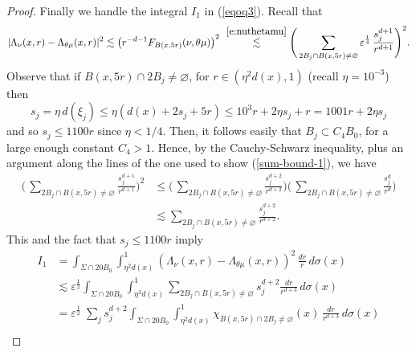 \documentclass[11pt]{amsart}
\newcommand{\rf}[1]{{(\ref{#1})}}
\newcommand{\ve}{{\varepsilon}}
\theoremstyle{definition}
\theoremstyle{remark}
\numberwithin{equation}{section}
\newcommand{\ps}[1]{\left( #1 \right)}
\def\lec{\lesssim}
\def\lec{\lesssim}
\newcommand{\jonas}[1]{}%
\begin{document}
\begin{proof}
Finally we handle the integral $I_1$ in \rf{eqoq3}.
 Recall that 
\begin{align*}
|\Lambda_{\nu}(x,r)-\Lambda_{\theta\mu}(x,r)|^{2}
&\lec \ps{r^{-d-1} F_{B(x,5r)}(\nu,\theta\mu)}^{2}
& \!\!\stackrel{\eqref{e:nuthetamu}}{ \lec}  \Biggl(\,\sum_{2B_{j}\cap B(x,5r)\neq\varnothing} \ve^{\frac14}\, \frac{s_{j}^{d+1}}{r^{d+1}}\Biggr)^{2}.
\end{align*}
Observe that if $B(x,5r)\cap 2B_{j}\neq\varnothing$, for $r\in (\eta^2d(x),1)$ (recall $\eta=10^{-3}$) then
\[
s_{j}=\eta\, d(\xi_{j}) \leq \eta(d(x)+2s_{j} + 5r) \leq 10^3r + 2\eta s_{j}+ r=1001r+2\eta s_{j}\]
and so $s_{j}\leq 1100r$ since $\eta<1/4$. Then, it follows easily that $B_j\subset C_4B_0$, for a large enough
constant $C_4>1$.
Hence, by the Cauchy-Schwarz inequality, plus an argument along the lines of the one used to show \rf{sum-bound-1}, we have
\begin{align*}
\biggl(\,\sum_{2B_{j}\cap B(x,5r)\neq\varnothing}  \frac{s_{j}^{d+1}}{r^{d+1}}\biggr)^{2}
& \leq 
\Biggl(\,\sum_{2B_{j}\cap B(x,5r)\neq\varnothing} \frac{s_{j}^{d+2}}{r^{d+2}}\Biggr)
\Biggl(\,\sum_{2B_{j}\cap B(x,5r)\neq\varnothing} \frac{s_{j}^{d}}{r^{d}}\Biggr)\\
& \lesssim \sum_{2B_{j}\cap B(x,5r)\neq\varnothing} \frac{s_{j}^{d+2}}{r^{d+2}}.
\end{align*}
This and the fact that $s_{j}\leq 1100r$ imply
\begin{align*}
I_1 &= \int_{\Sigma \cap 20 B_0} \int_{\eta^2 d(x)}^{1} \!(\Lambda_{\nu}(x,r)-  \Lambda_{\theta \mu}(x,r))^{2}\,\frac{dr}{r}\,d\sigma(x)\\
& \lec \ve^{\frac12} \int_{\Sigma\cap 20 B_{0}}\int_{\eta^2 d(x)}^{1} \sum_{2B_{j}\cap B(x,5r)\neq\varnothing}  s_{j}^{d+2} \frac{dr}{r^{d+3}}\, d\sigma(x) \\
& = \ve^{\frac12} \;\sum_{j} s_{j}^{d+2}  \int_{\Sigma\cap 20 B_{0}}\int_{\eta^2 d(x)}^{1}\chi_{B(x,5r)\cap 2B_{j}\neq\varnothing}(x)\, \frac{dr}{r^{d+3}}\, d\sigma(x) \\

\end{align*}
\end{proof}
\end{document}
